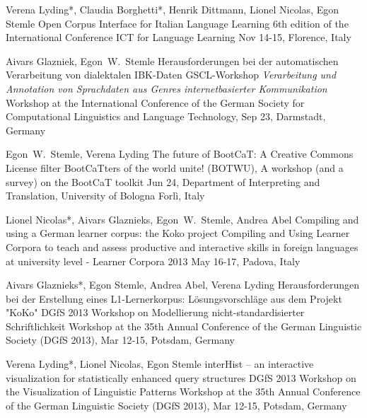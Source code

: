 \documentclass[11pt,a4paper]{moderncv}
\begin{document}
        {Verena Lyding*, Claudia Borghetti*, Henrik Dittmann, Lionel Nicolas, Egon Stemle}
        {\small Open Corpus Interface for Italian Language Learning}
        {\small 6th edition of the International Conference ICT for Language Learning}
        {\small Nov 14-15, Florence, Italy}
        {}

        {Aivars Glazniek, Egon~W.~Stemle}
        {\small Herausforderungen bei der automatischen Verarbeitung von dialektalen IBK-Daten}
        {\small GSCL-Workshop \emph{Verarbeitung und Annotation von Sprachdaten aus
        Genres internetbasierter Kommunikation}}
        {\small Workshop at the International Conference of the German Society
        for Computational Linguistics and Language Technology, Sep 23,
        Darmstadt, Germany}
        {}

        {Egon~W.~Stemle, Verena Lyding}
        {\small The future of BootCaT: A Creative Commons License filter}
        {\small BootCaTters of the world unite! (BOTWU), A workshop (and a
        survey) on the BootCaT toolkit}
        {\small Jun 24, Department of Interpreting and Translation, University
        of Bologna Forl\`{i}, Italy}
        {}

        {Lionel Nicolas*, Aivars Glaznieks, Egon~W.~Stemle, Andrea Abel}
        {\small Compiling and using a German learner corpus: the Koko project}
        {\small Compiling and Using Learner Corpora to teach and assess
        productive and interactive skills in foreign languages at university
        level - Learner Corpora 2013}
        {\small May 16-17, Padova, Italy}
        {}

        {Aivars Glaznieks*, Egon Stemle, Andrea Abel, Verena Lyding}
        {\small Herausforderungen bei der Erstellung eines L1-Lernerkorpus:
        Lösungsvorschläge aus dem Projekt "KoKo"}
        {\small DGfS 2013 Workshop on Modellierung nicht-standardisierter
        Schriftlichkeit}
        {\small Workshop at the 35th Annual Conference of the German Linguistic
        Society (DGfS 2013), Mar 12-15, Potsdam, Germany}
        {}

        {Verena Lyding*, Lionel Nicolas, Egon Stemle}
        {\small interHist -- an interactive visualization for statistically
        enhanced query structures}
        {\small DGfS 2013 Workshop on the Visualization of Linguistic Patterns}
        {\small Workshop at the 35th Annual Conference of the German Linguistic
        Society (DGfS 2013), Mar 12-15, Potsdam, Germany}
        {}
\end{document}
